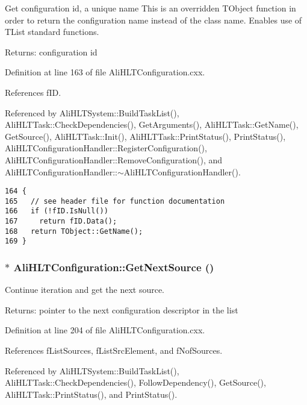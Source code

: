 Get configuration id, a unique name This is an overridden TObject function in order to return the configuration name instead of the class name. Enables use of TList standard functions. \begin{Desc}
\item[Returns:]configuration id \end{Desc}


Definition at line 163 of file Ali\-HLTConfiguration.cxx.

References f\-ID.

Referenced by Ali\-HLTSystem::Build\-Task\-List(), Ali\-HLTTask::Check\-Dependencies(), Get\-Arguments(), Ali\-HLTTask::Get\-Name(), Get\-Source(), Ali\-HLTTask::Init(), Ali\-HLTTask::Print\-Status(), Print\-Status(), Ali\-HLTConfiguration\-Handler::Register\-Configuration(), Ali\-HLTConfiguration\-Handler::Remove\-Configuration(), and Ali\-HLTConfiguration\-Handler::$\sim$Ali\-HLTConfiguration\-Handler().

\footnotesize\begin{verbatim}164 {
165   // see header file for function documentation
166   if (!fID.IsNull())
167     return fID.Data();
168   return TObject::GetName();
169 }
\end{verbatim}\normalsize 


\subsubsection{ $\ast$ Ali\-HLTConfiguration::Get\-Next\-Source ()}\label{classAliHLTConfiguration_a13}


Continue iteration and get the next source. \begin{Desc}
\item[Returns:]pointer to the next configuration descriptor in the list \end{Desc}


Definition at line 204 of file Ali\-HLTConfiguration.cxx.

References f\-List\-Sources, f\-List\-Src\-Element, and f\-Nof\-Sources.

Referenced by Ali\-HLTSystem::Build\-Task\-List(), Ali\-HLTTask::Check\-Dependencies(), Follow\-Dependency(), Get\-Source(), Ali\-HLTTask::Print\-Status(), and Print\-Status().

